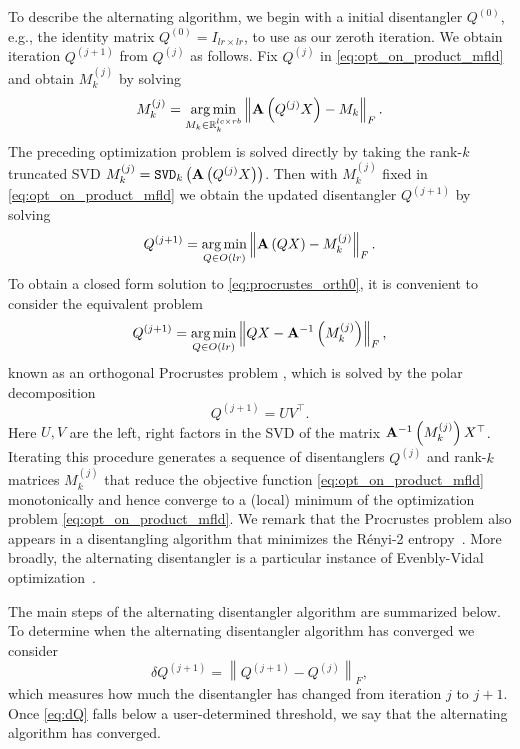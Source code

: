 \documentclass[pdflatex,sn-mathphys-num]{sn-jnl}
\newcounter{thm}[section]
\DeclareMathOperator*{\argmin}{arg\,min}
\begin{document}
To describe the alternating algorithm, we begin with a initial disentangler $Q^{(0)}$, e.g., the identity matrix $Q^{(0)} = I_{lr \times lr}$, to use as our zeroth iteration. We obtain iteration $Q^{(j+1)}$ from $Q^{(j)}$ as follows. Fix $Q^{(j)}$ in \eqref{eq:opt_on_product_mfld} and obtain $M_k^{(j)}$ by solving 
\begin{equation}
    M_k^{(j)} = \argmin_{M_k \in \mathbb{R}_k^{lc \times rb}} 
    \left\| {\bf A}\left(Q^{(j)}X\right) - M_k\right\|_F. 
\end{equation}
The preceding optimization problem is solved directly by taking the rank-$k$ truncated SVD $M_k^{(j)} = \texttt{SVD}_k\left({\bf A}\left(Q^{(j)}X\right)\right)$. Then with $M_k^{(j)}$ fixed in \eqref{eq:opt_on_product_mfld} we obtain the updated disentangler $Q^{(j+1)}$ by solving 
\begin{equation}
\label{eq:procrustes_orth0}
    Q^{(j+1)} = \argmin_{Q \in O(lr)} \left\|{\bf A}\left(QX\right) - M_k^{(j)} \right\|_F. 
\end{equation}
To obtain a closed form solution to \eqref{eq:procrustes_orth0}, it is convenient to consider the equivalent problem 
\begin{equation}
\label{eq:procrustes_orth}
     Q^{(j+1)} = \argmin_{Q \in O(lr)} 
     \left\| QX - {\bf A}^{-1} \left(M_k^{(j)}\right)\right\|_F, 
\end{equation}
known as an orthogonal Procrustes problem \cite{Procrustes}, which is solved by the polar decomposition 
\begin{equation}
     Q^{(j+1)} = UV^{\top}. 
\end{equation}
%
Here $U,V$ are the left, right factors in the SVD of the matrix ${\bf A}^{-1}\left(M_k^{(j)}\right)X^{\top}$. Iterating this procedure generates a sequence of disentanglers $Q^{(j)}$ and rank-$k$ matrices $M_k^{(j)}$ that reduce the objective function \eqref{eq:opt_on_product_mfld} monotonically and hence converge to a (local) minimum of the optimization problem \eqref{eq:opt_on_product_mfld}. 
We remark that the Procrustes problem also appears in a disentangling algorithm that minimizes the Rényi-2 entropy~\cite{hauschildFindingPurificationsMinimal2018}. More broadly, the alternating disentangler is a particular instance of Evenbly-Vidal optimization~\cite{evenblyAlgorithmsEntanglementRenormalization2009}. 
%

The main steps of the alternating disentangler algorithm are summarized below. To determine when the alternating disentangler algorithm has converged we consider 
\begin{equation} \label{eq:dQ}
    \delta Q^{(j+1)} = \left\| Q^{(j+1)}-Q^{(j)} \right\|_F,
\end{equation}
which measures how much the disentangler has changed from iteration $j$ to $j+1$. Once \eqref{eq:dQ} falls below a user-determined threshold, we say that the alternating algorithm has converged. 
\end{document}

